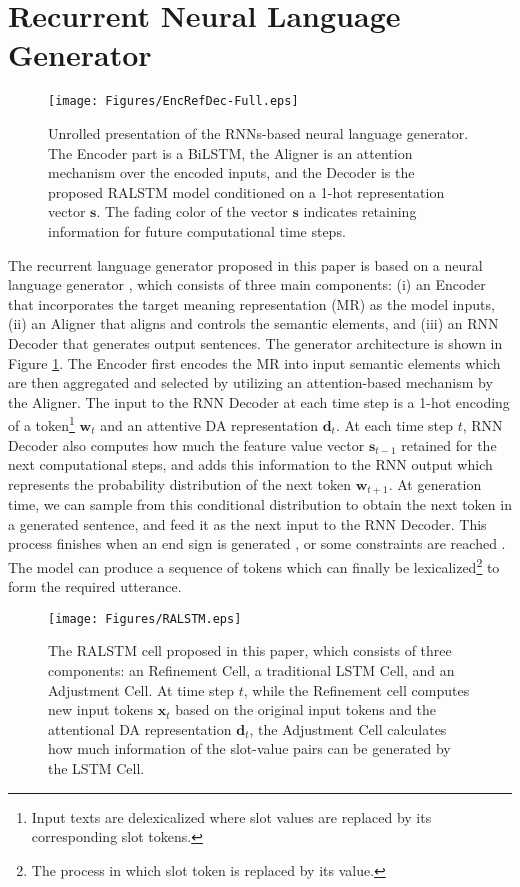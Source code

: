\documentclass[11pt,a4paper]{article}
\begin{document}
\section{Recurrent Neural Language Generator}\label{sec:method}
\begin{figure}[!ht]
	\centering
    \texttt{[image: Figures/EncRefDec-Full.eps]}
    \caption{Unrolled presentation of the RNNs-based neural language generator. The Encoder part is a BiLSTM, the Aligner is an attention mechanism over the encoded inputs, and the Decoder is the proposed RALSTM model conditioned on a 1-hot representation vector $\textbf{s}$. The fading color of the vector $\textbf{s}$ indicates retaining information for future computational time steps.}
    \label{fig:nlg-model}
\end{figure}
The recurrent language generator proposed in this paper is based on a neural language generator \cite{wentoward}, which consists of three main components: (i) an Encoder that incorporates the target meaning representation (MR) as the model inputs, (ii) an Aligner that aligns and controls the semantic elements, and (iii) an RNN Decoder that generates output sentences. The generator architecture is shown in Figure \ref{fig:nlg-model}. The Encoder first encodes the MR into input semantic elements which are then aggregated and selected by utilizing an attention-based mechanism by the Aligner. The input to the RNN Decoder at each time step is a 1-hot encoding of a token\footnote{Input texts are delexicalized where slot values are replaced by its corresponding slot tokens.} $\textbf{w}_{t}$ and an attentive DA representation $\textbf{d}_{t}$. At each time step $t$, RNN Decoder also computes how much the feature value vector $\textbf{s}_{t-1}$ retained for the next computational steps, and adds this information to the RNN output which represents the probability distribution of the next token $\textbf{w}_{t+1}$. At generation time, we can sample from this conditional distribution to obtain the next token in a generated sentence, and feed it as the next input to the RNN Decoder. This process finishes when an end sign is generated \cite{karpathy2015deep}, or some constraints are reached \cite{zhang2014chinese}. The model can produce a sequence of tokens which can finally be lexicalized\footnote{The process in which slot token is replaced by its value.} to form the required utterance. 

\begin{figure}[!ht]
	\centering
    \texttt{[image: Figures/RALSTM.eps]}
    \caption{The RALSTM cell proposed in this paper, which consists of three components: an Refinement Cell, a traditional LSTM Cell, and an Adjustment Cell. At time step $t$, while the Refinement cell computes new input tokens $\textbf{x}_{t}$ based on the original input tokens and the attentional DA representation $\textbf{d}_{t}$, the Adjustment Cell calculates how much information of the slot-value pairs can be generated by the LSTM Cell. }
    \label{fig:RALSTM-model}
\end{figure}
\end{document}
